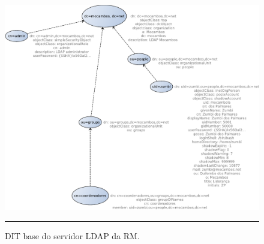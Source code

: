 \begin{figure}[htbp]
  \centering
  \includegraphics[width=\textwidth]{./Figure/DIT_ReteMocambos-crop.pdf}
  \rule{35em}{0.5pt}
  \caption[DIT base do servidor LDAP da RM]{DIT base do servidor LDAP da RM.}
  \label{fig:DIT_ReteMocambos}
\end{figure}




